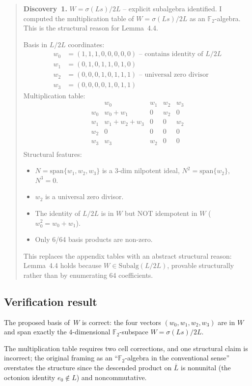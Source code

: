 \documentclass[11pt]{amsart}
\newcommand{\FF}{\mathbb{F}}
\begin{document}
\begin{quote}
\textbf{Discovery~1.}  $W = \sigma(Ls)/2L$ -- explicit subalgebra
identified. I computed the multiplication table of $W = \sigma(Ls)/2L$
as an $\FF_2$-algebra. This is the structural reason for Lemma~4.4.

Basis in $L/2L$ coordinates:
\begin{align*}
  w_0 &= (1,1,1,0,0,0,0,0) \text{ -- contains identity of } L/2L \\
  w_1 &= (0,1,0,1,1,0,1,0) \\
  w_2 &= (0,0,0,1,0,1,1,1) \text{ -- universal zero divisor} \\
  w_3 &= (0,0,0,0,1,0,1,1)
\end{align*}
Multiplication table:
\[
\begin{array}{c|cccc}
 & w_0 & w_1 & w_2 & w_3 \\ \hline
w_0 & w_0+w_1   & 0 & w_2 & 0 \\
w_1 & w_1+w_2+w_3 & 0 & 0   & w_2 \\
w_2 & 0         & 0 & 0   & 0 \\
w_3 & w_3       & w_2 & 0 & 0 \\
\end{array}
\]
Structural features:
\begin{itemize}
\item $N = \mathrm{span}\{w_1, w_2, w_3\}$ is a 3-dim nilpotent ideal,
  $N^2 = \mathrm{span}\{w_2\}$, $N^3 = 0$.
\item $w_2$ is a universal zero divisor.
\item The identity of $L/2L$ is in $W$ but NOT idempotent in $W$
  ($w_0^2 = w_0 + w_1$).
\item Only 6/64 basis products are non-zero.
\end{itemize}
This replaces the appendix tables with an abstract structural reason:
Lemma~4.4 holds because $W \in \mathrm{Subalg}(L/2L)$, provable
structurally rather than by enumerating 64 coefficients.
\end{quote}

\subsection*{Verification result}

The proposed basis of~$W$ is correct: the four vectors
$(w_0, w_1, w_2, w_3)$ are in $W$ and span exactly the $4$-dimensional
$\FF_2$-subspace $W = \sigma(Ls)/2L$.

The multiplication table requires two cell corrections, and one
structural claim is incorrect; the original framing as an
``$\FF_2$-algebra in the conventional sense'' overstates the
structure since the descended product on $\bar L$ is nonunital
(the octonion identity $e_0 \notin L$) and noncommutative.
\end{document}
